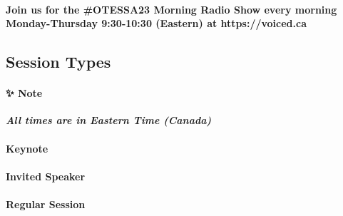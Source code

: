 \documentclass[
]{book}
\begin{document}
\begin{protip}
\hypertarget{join-us-for-the-otessa23-morning-radio-show-every-morning-monday-thursday-930-1030-eastern-at-httpsvoiced.ca}{%
\paragraph{Join us for the \#OTESSA23 Morning Radio Show every morning
Monday-Thursday 9:30-10:30 (Eastern) at
https://voiced.ca}\label{join-us-for-the-otessa23-morning-radio-show-every-morning-monday-thursday-930-1030-eastern-at-httpsvoiced.ca}}
\end{protip}

\hypertarget{session-types-3}{%
\subsection*{Session Types}\label{session-types-3}}

\begin{protip}
\hypertarget{note}{%
\paragraph*{✨ Note}\label{note}}

\textbf{\emph{All times are in Eastern Time (Canada)}}
\end{protip}

\begin{keynote}
\hypertarget{keynote}{%
\paragraph{Keynote}\label{keynote}}
\end{keynote}

\begin{speaker}
\hypertarget{invited-speaker}{%
\paragraph{Invited Speaker}\label{invited-speaker}}
\end{speaker}

\begin{session}
\hypertarget{regular-session}{%
\paragraph{Regular Session}\label{regular-session}}
\end{session}
\end{document}
